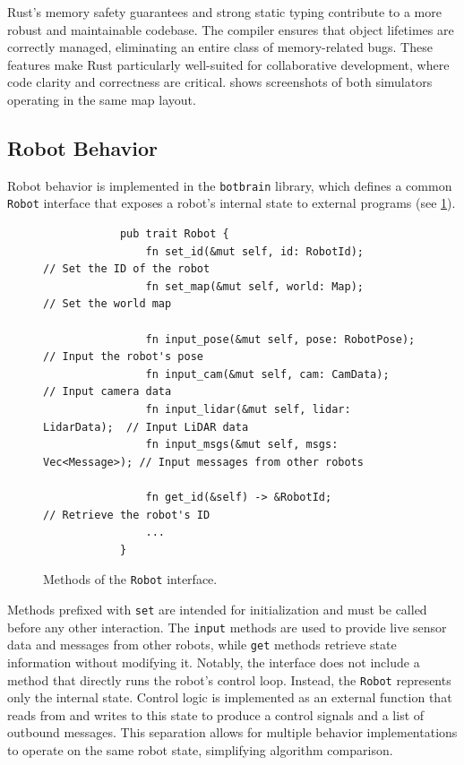 Rust's memory safety guarantees and strong static typing contribute to a more robust and maintainable codebase. The compiler ensures that object lifetimes are correctly managed, eliminating an entire class of memory-related bugs. These features make Rust particularly well-suited for collaborative development, where code clarity and correctness are critical.  shows screenshots of both simulators operating in the same map layout.

\subsection{Robot Behavior}
Robot behavior is implemented in the \texttt{botbrain} library, which defines a common \texttt{Robot} interface that exposes a robot’s internal state to external programs (see \cref{fig:robot-interface}).

\begin{figure}[H]
    \begin{center}
        \begin{verbatim}
            pub trait Robot {
                fn set_id(&mut self, id: RobotId);            // Set the ID of the robot
                fn set_map(&mut self, world: Map);            // Set the world map

                fn input_pose(&mut self, pose: RobotPose);    // Input the robot's pose
                fn input_cam(&mut self, cam: CamData);        // Input camera data
                fn input_lidar(&mut self, lidar: LidarData);  // Input LiDAR data
                fn input_msgs(&mut self, msgs: Vec<Message>); // Input messages from other robots

                fn get_id(&self) -> &RobotId;                 // Retrieve the robot's ID
                ...
            }
        \end{verbatim}
    \end{center}
    \caption{Methods of the \texttt{Robot} interface.}
    \label{fig:robot-interface}
\end{figure}

Methods prefixed with \texttt{set} are intended for initialization and must be called before any other interaction. The \texttt{input} methods are used to provide live sensor data and messages from other robots, while \texttt{get} methods retrieve state information without modifying it. Notably, the interface does not include a method that directly runs the robot’s control loop. Instead, the \texttt{Robot} represents only the internal state. Control logic is implemented as an external function that reads from and writes to this state to produce a control signals and a list of outbound messages. This separation allows for multiple behavior implementations to operate on the same robot state, simplifying algorithm comparison.

